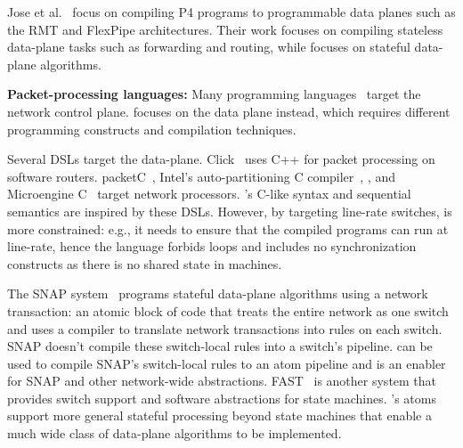 Jose et al.~\cite{lavanya_compiler} focus on compiling P4 programs to
programmable data planes such as the RMT and FlexPipe architectures. Their work
focuses on compiling stateless data-plane tasks such as forwarding and routing,
while \pktlanguage focuses on stateful data-plane algorithms.

\textbf{Packet-processing languages:}
Many programming languages~\cite{frenetic, maple} target the network control plane.
\pktlanguage focuses on the data plane instead, which requires different
programming constructs and compilation techniques.

Several DSLs target the data-plane. Click~\cite{click} uses C++ for packet
processing on software routers. packetC~\cite{packetc}, Intel's
auto-partitioning C compiler~\cite{intel_uiuc_pldi}, , and Microengine
C~\cite{microenginec} target network processors. \pktlanguage's C-like syntax
and sequential semantics are inspired by these DSLs. However, by targeting
line-rate switches, \pktlanguage is more constrained: e.g., it needs to ensure
that the compiled programs can run at line-rate, hence the language forbids
loops and includes no synchronization constructs as there is no shared state in
\absmachine machines.

The SNAP system~\cite{snap} programs stateful data-plane algorithms using a
network transaction: an atomic block of code that treats the entire network as
one switch~\cite{onebigswitch} and uses a compiler to translate network
transactions into rules on each switch. SNAP doesn't compile these switch-local
rules into a switch's pipeline. \pktlanguage can be used to compile SNAP's
switch-local rules to an atom pipeline and is an enabler for SNAP and other
network-wide abstractions. FAST~\cite{fast} is another system that provides switch
support and software abstractions for state machines. \absmachine's atoms
support more general stateful processing beyond state machines that enable
a much wide class of data-plane algorithms to be implemented.
